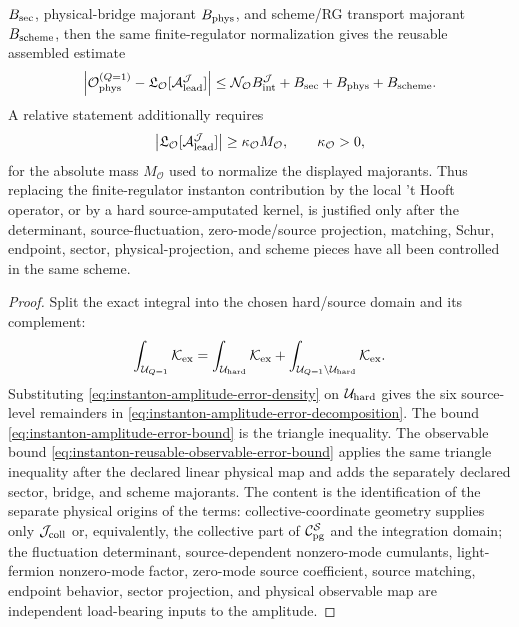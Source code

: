 \begin{proposition}
\(B_{\rm sec}\), physical-bridge majorant \(B_{\rm phys}\), and scheme/RG
transport majorant \(B_{\rm scheme}\), then the same finite-regulator
normalization gives the reusable assembled estimate
\begin{equation}
  \left|
    \mathcal O_{\rm phys}^{(Q=1)}
    -
    \mathfrak L_{\mathcal O}
    [\mathcal A_{\rm lead}^{\mathcal J}]
  \right|
  \le
  \mathcal N_{\mathcal O}B_{\rm int}^{\mathcal J}
  +B_{\rm sec}+B_{\rm phys}+B_{\rm scheme}.
  \label{eq:instanton-reusable-observable-error-bound}
\end{equation}
A relative statement additionally requires
\[
  \left|
    \mathfrak L_{\mathcal O}
    [\mathcal A_{\rm lead}^{\mathcal J}]
  \right|
  \ge
  \kappa_{\mathcal O}M_{\mathcal O},
  \qquad \kappa_{\mathcal O}>0,
\]
for the absolute mass \(M_{\mathcal O}\) used to normalize the displayed
majorants.
Thus replacing the finite-regulator instanton contribution by the local
't Hooft operator, or by a hard source-amputated kernel, is justified only
after the determinant, source-fluctuation, zero-mode/source projection,
matching, Schur, endpoint, sector, physical-projection, and scheme pieces have
all been controlled in the same scheme.
\end{proposition}

\begin{proof}
Split the exact integral into the chosen hard/source domain and its complement:
\[
  \int_{\mathcal U_{Q=1}}\mathcal K_{\rm ex}
  =
  \int_{\mathcal U_{\rm hard}}\mathcal K_{\rm ex}
  +
  \int_{\mathcal U_{Q=1}\setminus\mathcal U_{\rm hard}}\mathcal K_{\rm ex}.
\]
Substituting
\eqref{eq:instanton-amplitude-error-density} on
\(\mathcal U_{\rm hard}\) gives the six source-level remainders in
\eqref{eq:instanton-amplitude-error-decomposition}.  The bound
\eqref{eq:instanton-amplitude-error-bound} is the triangle inequality.  The
observable bound
\eqref{eq:instanton-reusable-observable-error-bound} applies the same triangle
inequality after the declared linear physical map and adds the separately
declared sector, bridge, and scheme majorants.  The content is the
identification of the separate physical origins of the
terms: collective-coordinate geometry supplies only \(\mathcal J_{\rm coll}\)
or, equivalently, the collective part of
\(\mathcal C_{\rm pg}^{\mathcal S}\) and the integration domain; the
fluctuation determinant, source-dependent nonzero-mode cumulants, light-fermion
nonzero-mode factor, zero-mode source coefficient, source matching, endpoint
behavior, sector projection, and physical observable map are independent
load-bearing inputs to the amplitude.
\end{proof}

